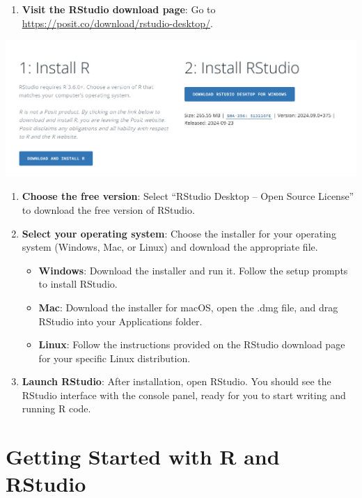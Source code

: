 \documentclass[
]{book}
\providecommand{\tightlist}{%
  \setlength{\itemsep}{0pt}\setlength{\parskip}{0pt}}
\begin{document}
\begin{enumerate}
\def\labelenumi{\arabic{enumi}.}
\tightlist
\item
  \textbf{Visit the RStudio download page}: Go to \url{https://posit.co/download/rstudio-desktop/}.
\end{enumerate}

\href{https://posit.co/download/rstudio-desktop/}{\includegraphics[width=1\textwidth,height=\textheight]{images/r-studio.png}}

\begin{enumerate}
\def\labelenumi{\arabic{enumi}.}
\setcounter{enumi}{1}
\tightlist
\item
  \textbf{Choose the free version}: Select ``RStudio Desktop -- Open Source License'' to download the free version of RStudio.
\item
  \textbf{Select your operating system}: Choose the installer for your operating system (Windows, Mac, or Linux) and download the appropriate file.

  \begin{itemize}
  \tightlist
  \item
    \textbf{Windows}: Download the installer and run it. Follow the setup prompts to install RStudio.
  \item
    \textbf{Mac}: Download the installer for macOS, open the .dmg file, and drag RStudio into your Applications folder.
  \item
    \textbf{Linux}: Follow the instructions provided on the RStudio download page for your specific Linux distribution.
  \end{itemize}
\item
  \textbf{Launch RStudio}: After installation, open RStudio. You should see the RStudio interface with the console panel, ready for you to start writing and running R code.
\end{enumerate}

\section{Getting Started with R and RStudio}\label{getting-started-with-r-and-rstudio}
\end{document}
